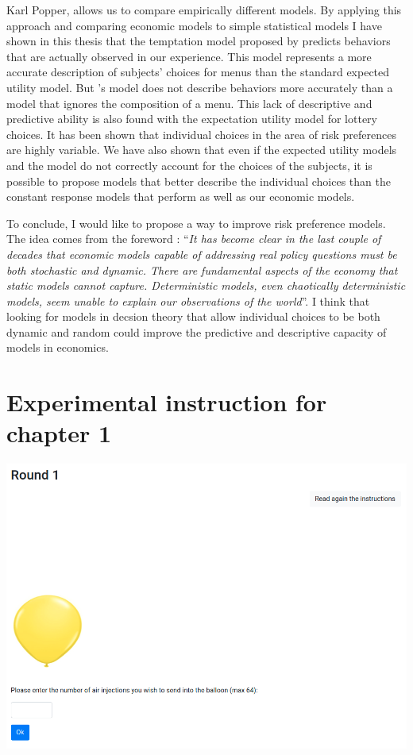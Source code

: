 \documentclass[
]{book}
\begin{document}
Karl Popper, allows us to compare empirically different models.
By applying this approach and comparing economic models to simple statistical
models I have shown in this thesis that the temptation model proposed by
\citet{gul2001temptation} predicts behaviors that are actually observed in our
experience.
This model represents a more accurate description of subjects' choices for menus
than the standard expected utility model.
But \citet{gul2001temptation}'s model does not describe behaviors more accurately than
a model that ignores the composition of a menu.
This lack of descriptive and predictive ability is also found with the
expectation utility model for lottery choices.
It has been shown that individual choices in the area of risk preferences are
highly variable.
We have also shown that even if the expected utility models and the
\citet{gul2001temptation} model do not correctly account for the choices of the
subjects, it is possible to propose models that better describe the individual
choices than the constant response models that perform as well as our economic models.

To conclude, I would like to propose a way to improve risk
preference models.
The idea comes from the foreword \citet{aliprantis2006hitchhiker}:
``\emph{It has become clear in the last couple of decades that economic
models capable of addressing real policy questions must be both stochastic
and dynamic. There are fundamental aspects of the economy that static models
cannot capture. Deterministic models, even chaotically deterministic models,
seem unable to explain our observations of the world}''.
I think that looking for models in decsion theory that allow individual choices
to be both dynamic
and random could improve the predictive and descriptive capacity of models in
economics.

\hypertarget{appendix-appendix}{%
\appendix}


\hypertarget{expe-instruc2}{%
\chapter{Experimental instruction for chapter 1}\label{expe-instruc2}}

\includegraphics[width=0.9\linewidth]{annexe_file/pump_decision}
\end{document}
